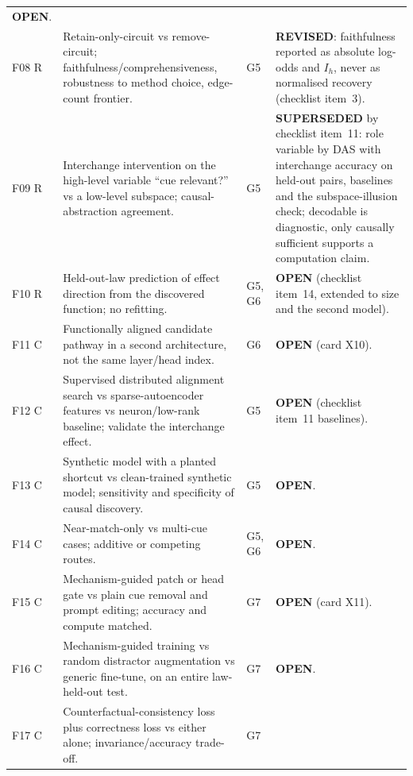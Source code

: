 \documentclass[10pt,a4paper]{article}
\begin{document}
\begin{longtable}{@{}P{1.2cm}P{7.2cm}P{1.3cm}P{5.6cm}@{}}
\textbf{OPEN}. \\
F08 \newline R & Retain-only-circuit vs remove-circuit; faithfulness/comprehensiveness, robustness to method choice, edge-count frontier. & G5 &
\textbf{REVISED}: faithfulness reported as absolute log-odds and $I_h$, never as normalised recovery (checklist item~3). \\
F09 \newline R & Interchange intervention on the high-level variable ``cue relevant?'' vs a low-level subspace; causal-abstraction agreement. & G5 &
\textbf{SUPERSEDED} by checklist item~11: role variable by DAS with interchange accuracy on held-out pairs, baselines and the subspace-illusion check; decodable is diagnostic, only causally sufficient supports a computation claim. \\
F10 \newline R & Held-out-law prediction of effect direction from the discovered function; no refitting. & G5, G6 &
\textbf{OPEN} (checklist item~14, extended to size and the second model). \\
F11 \newline C & Functionally aligned candidate pathway in a second architecture, not the same layer/head index. & G6 &
\textbf{OPEN} (card X10). \\
F12 \newline C & Supervised distributed alignment search vs sparse-autoencoder features vs neuron/low-rank baseline; validate the interchange effect. & G5 &
\textbf{OPEN} (checklist item~11 baselines). \\
F13 \newline C & Synthetic model with a planted shortcut vs clean-trained synthetic model; sensitivity and specificity of causal discovery. & G5 &
\textbf{OPEN}. \\
F14 \newline C & Near-match-only vs multi-cue cases; additive or competing routes. & G5, G6 &
\textbf{OPEN}. \\
F15 \newline C & Mechanism-guided patch or head gate vs plain cue removal and prompt editing; accuracy and compute matched. & G7 &
\textbf{OPEN} (card X11). \\
F16 \newline C & Mechanism-guided training vs random distractor augmentation vs generic fine-tune, on an entire law-held-out test. & G7 &
\textbf{OPEN}. \\
F17 \newline C & Counterfactual-consistency loss plus correctness loss vs either alone; invariance/accuracy trade-off. & G7 &

\end{longtable}
\end{document}
